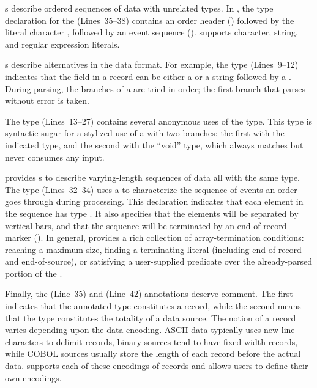s describe ordered sequences of data with unrelated types.
In , the type declaration for the 
 (Lines~35--38)
contains an order header
() followed by the literal character ,
followed by an event sequence ().  \pads{} supports
character, string, and regular expression literals.

s describe alternatives in the data format.  For example,
the  type (Lines~9--12) indicates
that the  field in a \dibbler{} record can be either a
 or a string  followed by a .
During parsing, the branches of a  are tried in order; the
first branch that parses without error is taken.  

The  type (Lines~13--27) contains several anonymous uses of the
 type.  This type is syntactic sugar for a stylized use of a
 with two branches: the first with the indicated type, and
the second with the ``void'' type, which always matches but never
consumes any input.

\pads{} provides s to describe varying-length sequences of
data all with the same type.  The  type (Lines~32--34) uses a
 to characterize the sequence of events an order goes
through during processing.  This declaration indicates that each
element in the sequence has type .  It also specifies
that the elements will be separated by vertical bars, and that the
sequence will be terminated by an end-of-record marker ().
In general, \pads{} provides a rich collection of array-termination
conditions: reaching a maximum size, finding a terminating literal
(including end-of-record and end-of-source), or satisfying a
user-supplied predicate over the already-parsed portion of the
.

Finally, the  (Line~35) and  (Line~42) annotations deserve comment.  The first
indicates that the annotated type constitutes a record,
while the second means that the type constitutes the totality of a data source.  
The notion of a record varies depending upon the data encoding.  
ASCII data typically uses new-line characters to delimit 
records, binary sources tend to have fixed-width records, while 
COBOL sources usually store the length of each record before the actual data.
\pads{} supports each of these encodings of records and allows users to define
their own encodings.  

